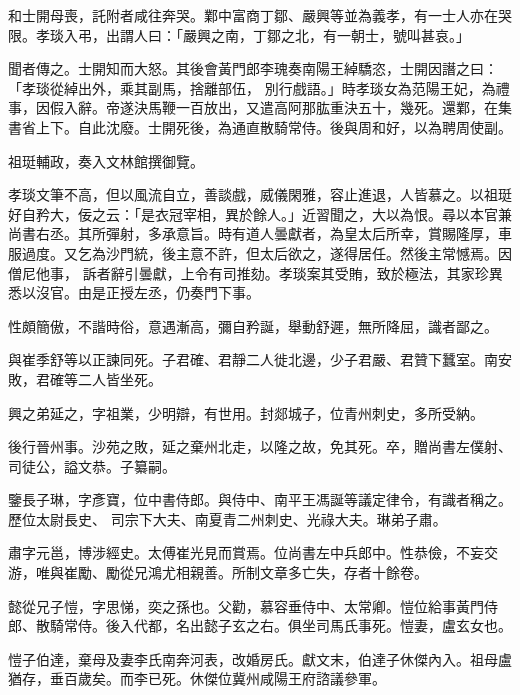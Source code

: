 \begin{pinyinscope}
 和士開母喪，託附者咸往奔哭。鄴中富商丁鄒、嚴興等並為義孝，有一士人亦在哭限。孝琰入弔，出謂人曰：「嚴興之南，丁鄒之北，有一朝士，號叫甚哀。」



 聞者傳之。士開知而大怒。其後會黃門郎李瑰奏南陽王綽驕恣，士開因譖之曰：「孝琰從綽出外，乘其副馬，捨離部伍，
 別行戲語。」時孝琰女為范陽王妃，為禮事，因假入辭。帝遂決馬鞭一百放出，又遣高阿那肱重決五十，幾死。還鄴，在集書省上下。自此沈廢。士開死後，為通直散騎常侍。後與周和好，以為聘周使副。



 祖珽輔政，奏入文林館撰御覽。



 孝琰文筆不高，但以風流自立，善談戲，威儀閑雅，容止進退，人皆慕之。以祖珽好自矜大，佞之云：「是衣冠宰相，異於餘人。」近習聞之，大以為恨。尋以本官兼尚書右丞。其所彈射，多承意旨。時有道人曇獻者，為皇太后所幸，賞賜隆厚，車服過度。又乞為沙門統，後主意不許，但太后欲之，遂得居任。然後主常憾焉。因僧尼他事，
 訴者辭引曇獻，上令有司推劾。孝琰案其受賄，致於極法，其家珍異悉以沒官。由是正授左丞，仍奏門下事。



 性頗簡傲，不諧時俗，意遇漸高，彌自矜誕，舉動舒遲，無所降屈，識者鄙之。



 與崔季舒等以正諫同死。子君確、君靜二人徙北邊，少子君嚴、君贊下蠶室。南安敗，君確等二人皆坐死。



 興之弟延之，字祖業，少明辯，有世用。封郯城子，位青州刺史，多所受納。



 後行晉州事。沙苑之敗，延之棄州北走，以隆之故，免其死。卒，贈尚書左僕射、司徒公，謚文恭。子纂嗣。



 鑒長子琳，字彥寶，位中書侍郎。與侍中、南平王馮誕等議定律令，有識者稱之。歷位太尉長史、
 司宗下大夫、南夏青二州刺史、光祿大夫。琳弟子肅。



 肅字元邕，博涉經史。太傅崔光見而賞焉。位尚書左中兵郎中。性恭儉，不妄交游，唯與崔勵、勵從兄鴻尤相親善。所制文章多亡失，存者十餘卷。



 懿從兄子愷，字思悌，奕之孫也。父勸，慕容垂侍中、太常卿。愷位給事黃門侍郎、散騎常侍。後入代都，名出懿子玄之右。俱坐司馬氏事死。愷妻，盧玄女也。



 愷子伯達，棄母及妻李氏南奔河表，改婚房氏。獻文末，伯達子休傑內入。祖母盧猶存，垂百歲矣。而李已死。休傑位冀州咸陽王府諮議參軍。




\end{pinyinscope}
